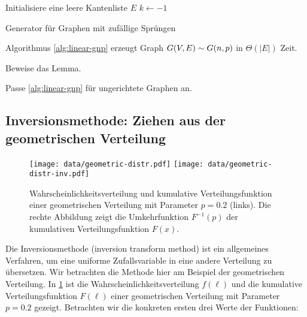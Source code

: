 \begin{algorithm}[H]
    Initialisiere eine leere Kantenliste $E$\;
    $k \gets -1$\;
    \caption{Generator für \Gnp Graphen mit zufällige Sprüngen}
    \label{alg:linear-gnp}
\end{algorithm}

\begin{lemma}
    \label{lem:linear-gnp}
    Algorithmus \ref{alg:linear-gnp} erzeugt Graph $G(V, E) \sim G(n, p)$ in $\Theta(|E|)$ Zeit.
\end{lemma}

\begin{exercise}
    Beweise das Lemma.
\end{exercise}
\begin{exercise}
    Passe \cref{alg:linear-gnp} für ungerichtete Graphen an.
\end{exercise}

\subsection{Inversionsmethode: Ziehen aus der geometrischen Verteilung}
\label{sec:inversionsmethode}

\begin{figure}[t]
    \begin{center}
        \texttt{[image: data/geometric-distr.pdf]}%
        \texttt{[image: data/geometric-distr-inv.pdf]}
    \end{center}

    \caption{
        Wahrscheinlichkeitsverteilung und kumulative Verteilungsfunktion einer geometrischen Verteilung mit Parameter $p = 0.2$ (links).
        Die rechte Abbildung zeigt die \glqq Umkehrfunktion\grqq{} $F^{-1}(p)$ der kumulativen Verteilungsfunktion $F(x)$.
    }
    \label{fig:geometric-distr}
\end{figure}

Die Inversionsmethode (inversion transform method) ist ein allgemeines Verfahren, um eine uniforme Zufallsvariable in eine andere Verteilung zu übersetzen.
Wir betrachten die Methode hier am Beispiel der geometrischen Verteilung.
In \cref{fig:geometric-distr} ist die Wahrscheinlichkeitsverteilung $f(\ell)$ und die kumulative Verteilungsfunktion $F(\ell)$ einer geometrischen Verteilung mit Parameter $p = 0.2$ gezeigt.
%
Betrachten wir die konkreten ersten drei Werte der Funktionen:

